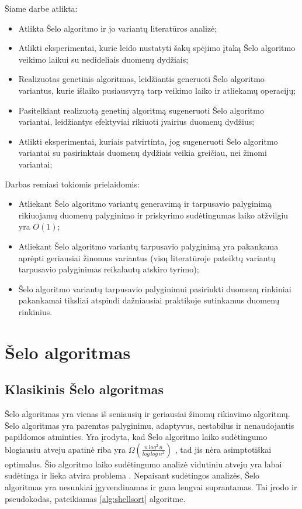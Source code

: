 \documentclass{VUMIFInfBakalaurinis}
\begin{document}
\medskip

Šiame darbe atlikta:
\begin{itemize}
    \item Atlikta Šelo algoritmo ir jo variantų literatūros analizė;
    \item Atlikti eksperimentai, kurie leido nustatyti šakų spėjimo įtaką Šelo algoritmo veikimo laikui su nedideliais duomenų dydžiais;
    \item Realizuotas genetinis algoritmas, leidžiantis generuoti Šelo algoritmo variantus, kurie išlaiko pusiausvyrą tarp veikimo laiko ir atliekamų operacijų;
    \item Pasitelkiant realizuotą genetinį algoritmą sugeneruoti Šelo algoritmo variantai, leidžiantys efektyviai rikiuoti įvairius duomenų dydžius;
    \item Atlikti eksperimentai, kuriais patvirtinta, jog sugeneruoti Šelo algoritmo variantai su pasirinktais duomenų dydžiais veikia greičiau, nei žinomi variantai;
\end{itemize}

\medskip

Darbas remiasi tokiomis prielaidomis:
\begin{itemize}
    \item Atliekant Šelo algoritmo variantų generavimą ir tarpusavio palyginimą rikiuojamų duomenų palyginimo ir priskyrimo sudėtingumas laiko atžvilgiu yra $O(1)$;
    \item Atliekant Šelo algoritmo variantų tarpusavio palyginimą yra pakankama aprėpti geriausiai žinomus variantus
        (visų literatūroje pateiktų variantų tarpusavio palyginimas reikalautų atskiro tyrimo);
    \item Šelo algoritmo variantų tarpusavio palyginimui pasirinkti duomenų rinkiniai pakankamai tiksliai atspindi dažniausiai praktikoje sutinkamus duomenų rinkinius.
\end{itemize}


\section{Šelo algoritmas}

\subsection{Klasikinis Šelo algoritmas}

Šelo algoritmas yra vienas iš seniausių ir geriausiai žinomų rikiavimo algoritmų.
Šelo algoritmas yra paremtas palyginimu, adaptyvus, nestabilus ir nenaudojantis papildomos atminties.
Yra įrodyta, kad Šelo algoritmo laiko sudėtingumo blogiausiu atveju apatinė riba yra
$\Omega(\frac{n\,log^2\,n}{log\,log\,n^2})$ \cite{plaxton1992}, tad jis nėra asimptotiškai optimalus.
Šio algoritmo laiko sudėtingumo analizė vidutiniu atveju yra labai sudėtinga
ir lieka atvira problema \cite{ciura2001best,Radavičius_Baranauskas_2013}.
Nepaisant sudėtingos analizės, Šelo algoritmas yra nesunkiai įgyvendinamas ir gana lengvai suprantamas.
Tai įrodo ir pseudokodas, pateikiamas \ref{alg:shellsort} algoritme.
\end{document}

